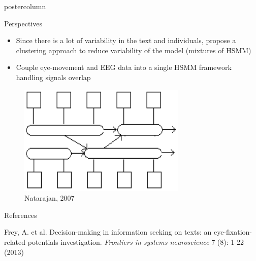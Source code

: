 \documentclass[final,hyperref={pdfpagelabels=false}]{beamer}
\begin{document}
\begin{frame}
\begin{columns}
\begin{column}{.50\textwidth}
\begin{beamercolorbox}[center,wd=\textwidth]{postercolumn}
\begin{minipage}[T]{.98\textwidth}
{            %

            \vfill
            \begin{block}{Perspectives}
                \vskip0.2cm
                \begin{minipage}{0.67\textwidth}
                    \begin{itemize}
                        \item[\bullet] Since there is a lot of variability in the text and individuals,
                        propose a clustering approach to reduce variability of the model (mixtures of HSMM)
                        \item[\bullet] Couple eye-movement and EEG data into a single HSMM framework handling signals overlap
                    \end{itemize}
                \end{minipage}
                \begin{minipage}{0.30\textwidth}
                    \begin{figure}[h]
                        \centering
                        \includegraphics[heigth=10cm]{chsmm_representation.png}
                        \caption{Natarajan, 2007}
                    \end{figure}
                \end{minipage}


            \end{block}

            \vfill
            \begin{block}{References}
                \begin{enumerate}
                    {\footnotesize
                    \item Frey, A. et al.
                    Decision-making in information seeking on texts: an eye-fixation-related potentials investigation.
                    \textit{Frontiers in systems neuroscience} 7 (8): 1-22 (2013)

}
\end{enumerate}
\end{block}}
\end{minipage}
\end{beamercolorbox}
\end{column}
\end{columns}
\end{frame}
\end{document}
